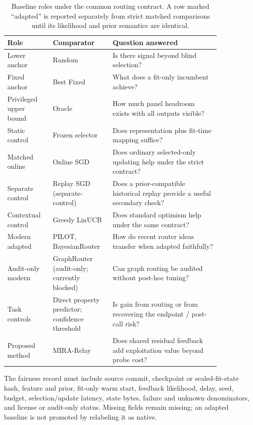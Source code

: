 \documentclass[sigconf,anonymous]{aamas}
\begin{document}
\begin{table}[t]
\caption{Baseline roles under the common routing contract. A row marked ``adapted'' is reported separately from strict matched comparisons until its likelihood and prior semantics are identical.}
\label{tab:baselines}
\small
\begin{tabular}{@{}P{0.19\linewidth}P{0.22\linewidth}P{0.45\linewidth}@{}}
\toprule
Role & Comparator & Question answered \\
\midrule
Lower anchor & Random & Is there signal beyond blind selection? \\
Fixed anchor & Best Fixed & What does a fit-only incumbent achieve? \\
Privileged upper bound & Oracle & How much panel headroom exists with all outputs visible? \\
Static control & Frozen selector & Does representation plus fit-time mapping suffice? \\
Matched online & Online SGD & Does ordinary selected-only updating help under the strict contract? \\
Separate control & Replay SGD (separate-control) & Does a prior-compatible historical replay provide a useful secondary check? \\
Contextual control & Greedy LinUCB & Does standard optimism help under the same contract? \\
Modern adapted & PILOT, BayesianRouter & How do recent router ideas transfer when adapted faithfully? \\
Audit-only modern & GraphRouter (audit-only; currently blocked) & Can graph routing be audited without post-hoc tuning? \\
Task controls & Direct property predictor; confidence threshold & Is gain from routing or from recovering the endpoint / post-call risk? \\
Proposed method & MIRA-Relay & Does shared residual feedback add exploitation value beyond probe cost? \\
\bottomrule
\end{tabular}
\end{table}

The fairness record must include source commit, checkpoint or sealed-fit-state hash, feature and prior, fit-only warm start, feedback likelihood, delay, seed, budget, selection/update latency, state bytes, failure and unknown denominators, and license or audit-only status. Missing fields remain missing; an adapted baseline is not promoted by relabeling it as native.
\end{document}
